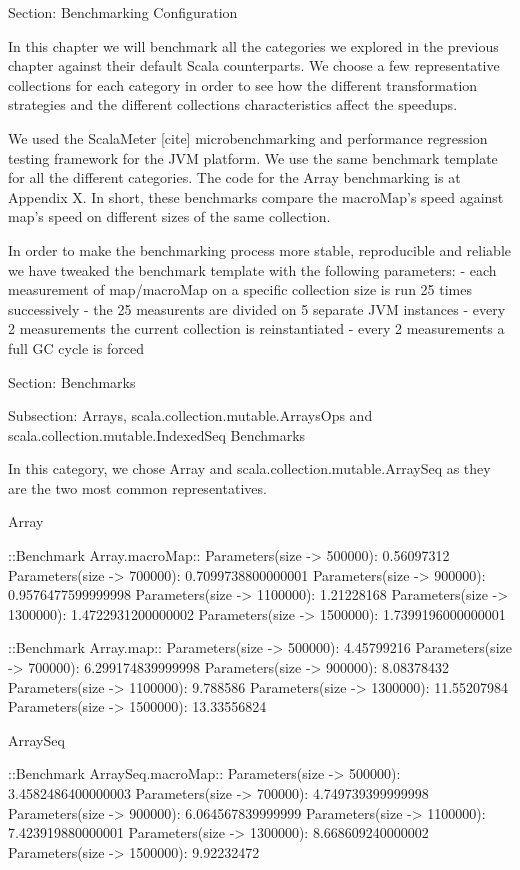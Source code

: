 Section: Benchmarking Configuration

In this chapter we will benchmark all the categories we explored in
the previous chapter against their default Scala counterparts. We choose a few
representative collections for each category in order to see how the different
transformation strategies and the different collections characteristics affect
the speedups.

We used the ScalaMeter [cite] microbenchmarking and performance regression
testing framework for the JVM platform. We use the same benchmark template for
all the different categories. The code for the Array benchmarking is at Appendix
X. In short, these benchmarks compare the macroMap's speed against map's speed
on different sizes of the same collection.

In order to make the benchmarking process more stable, reproducible and reliable
we have tweaked the benchmark template with the following parameters:
- each measurement of map/macroMap on a specific collection size is run 25
times successively
- the 25 measurents are divided on 5 separate JVM instances
- every 2 measurements the current collection is reinstantiated
- every 2 measurements a full GC cycle is forced



Section: Benchmarks

Subsection: Arrays, scala.collection.mutable.ArraysOps and
scala.collection.mutable.IndexedSeq Benchmarks

In this category, we chose Array and scala.collection.mutable.ArraySeq as they
are the two most common representatives.

Array

::Benchmark Array.macroMap::
Parameters(size -> 500000): 0.56097312
Parameters(size -> 700000): 0.7099738800000001
Parameters(size -> 900000): 0.9576477599999998
Parameters(size -> 1100000): 1.21228168
Parameters(size -> 1300000): 1.4722931200000002
Parameters(size -> 1500000): 1.7399196000000001

::Benchmark Array.map::
Parameters(size -> 500000): 4.45799216
Parameters(size -> 700000): 6.299174839999998
Parameters(size -> 900000): 8.08378432
Parameters(size -> 1100000): 9.788586
Parameters(size -> 1300000): 11.55207984
Parameters(size -> 1500000): 13.33556824


ArraySeq

::Benchmark ArraySeq.macroMap::
Parameters(size -> 500000): 3.4582486400000003
Parameters(size -> 700000): 4.749739399999998
Parameters(size -> 900000): 6.064567839999999
Parameters(size -> 1100000): 7.423919880000001
Parameters(size -> 1300000): 8.668609240000002
Parameters(size -> 1500000): 9.92232472

